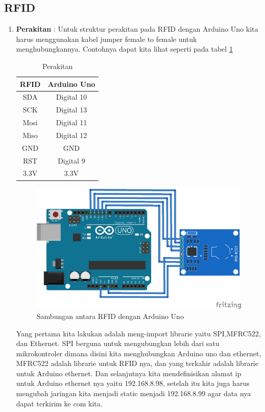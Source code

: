 \subsection{RFID}
\begin{enumerate}
\item \textbf{Perakitan} : Untuk struktur perakitan pada RFID dengan Arduino Uno kita harus menggunakan kabel jumper female to female untuk menghubungkannya. Contohnya dapat kita lihat seperti pada tabel \ref{table:Perakitan RFID}
\begin{table}[h]
\caption{Perakitan}
\centering
\begin{tabular}{|c|c|}
\hline
\textbf{RFID}&\textbf{Arduino Uno}\\
\hline
SDA&Digital 10\\
\hline
SCK&Digital 13\\
\hline
Mosi&Digital 11\\
\hline
Miso&Digital 12\\
\hline
GND&GND\\
\hline
RST&Digital 9\\
\hline
3.3V&3.3V\\
\hline
\end{tabular}
\label{table:Perakitan RFID}
\end{table}

\begin{figure}[!htbp]
\centering
\includegraphics[width=.75\textwidth]{figures/CONV/rfid.jpg}
\caption{Sambungan antara RFID dengan Arduino Uno}\label{fig:rfid}
\end{figure}

\subitem Yang pertama kita lakukan adalah meng-import librarie yaitu SPI,MFRC522, dan Ethernet. SPI berguna untuk mengubungkan lebih dari satu mikrokontroler dimana disini kita menghubungkan Arduino uno dan ethernet, MFRC522 adalah librarie untuk RFID nya, dan yang terkahir adalah librarie untuk Arduino ethernet. Dan selanjutnya kita mendefinisikan alamat ip untuk Arduino ethernet nya yaitu 192.168.8.98, setelah itu kita juga harus mengubah jaringan kita menjadi static menjadi 192.168.8.99 agar data nya dapat terkirim ke com kita.


\end{enumerate}
